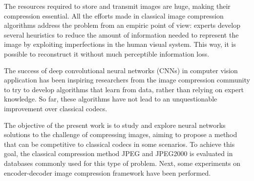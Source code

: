 The resources required to store and transmit images are huge, making their compression essential. All the efforts made in classical image compression algorithms address the problem from an empiric point of view: experts develop several heuristics to reduce the amount of information needed to represent the image by exploiting imperfections in the human visual system. This way, it is possible to reconstruct it without much perceptible information loss.

The success of deep convolutional neural networks (CNNs) in computer vision application has been inspiring researchers from the image compression community to try to develop algorithms that learn from data, rather than relying on expert knowledge. So far, these algorithms have not lead to an unquestionable improvement over classical codecs.

The objective of the present work is to study and explore neural networks solutions to the challenge of compressing images, aiming to propose a method that can be competitive to classical codecs in some scenarios. To achieve this goal, the classical compression method JPEG and JPEG2000 is evaluated in databases commonly used for this type of problem. Next, some experiments on encoder-decoder image compression framework have been performed.


